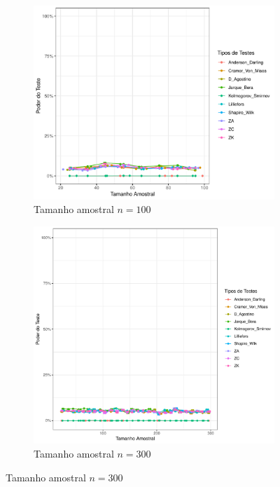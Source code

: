 \documentclass[a4paper,11pt]{article} %
\begin{document}
\begin{figure}[H]
    \vspace{0.5cm} %
    \begin{subfigure}[b]{0.45\textwidth}
        \centering
        \includegraphics[width=\textwidth]{Distribuição Normal/Poder do Teste/poder_teste_normal_100.pdf}
        \caption{Tamanho amostral \(n = 100\)}
        \label{fig:normal_poder_100}
    \end{subfigure}
    \hfill
    \begin{subfigure}[b]{0.45\textwidth}
        \centering
        \includegraphics[width=\textwidth]{Distribuição Normal/Poder do Teste/poder_teste_normal_300.pdf}
        \caption{Tamanho amostral \(n = 300\)}
        \label{fig:normal_poder_300}
    \end{subfigure}
    

\end{figure}
\end{document}
